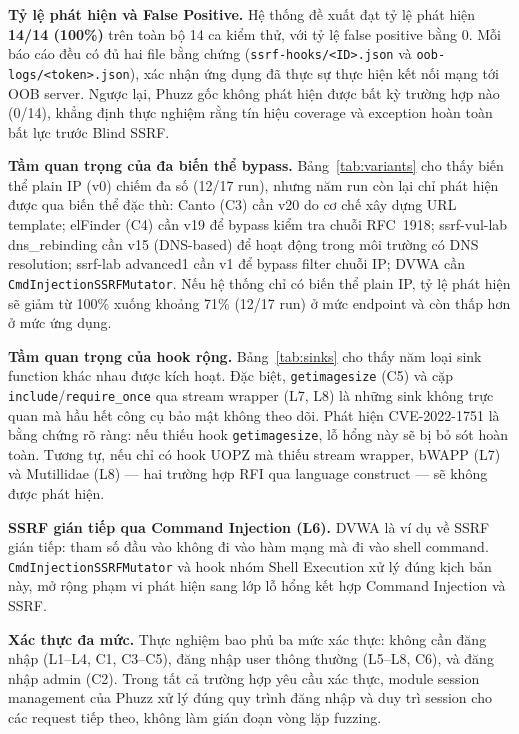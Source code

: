 \textbf{Tỷ lệ phát hiện và False Positive.}
Hệ thống đề xuất đạt tỷ lệ phát hiện \textbf{14/14 (100\%)} trên toàn
bộ 14 ca kiểm thử, với tỷ lệ false positive bằng 0. Mỗi báo cáo đều
có đủ hai file bằng chứng (\texttt{ssrf-hooks/<ID>.json} và
\texttt{oob-logs/<token>.json}), xác nhận ứng dụng đã thực sự thực
hiện kết nối mạng tới OOB server. Ngược lại, Phuzz gốc không phát hiện
được bất kỳ trường hợp nào (0/14), khẳng định thực nghiệm rằng tín
hiệu coverage và exception hoàn toàn bất lực trước Blind SSRF.

\textbf{Tầm quan trọng của đa biến thể bypass.}
Bảng~\ref{tab:variants} cho thấy biến thể plain IP (v0) chiếm đa số
(12/17 run), nhưng năm run còn lại chỉ phát hiện được qua biến thể
đặc thù: Canto (C3) cần v20 do cơ chế xây dựng URL template; elFinder
(C4) cần v19 để bypass kiểm tra chuỗi RFC~1918; ssrf-vul-lab
dns\_rebinding cần v15 (DNS-based) để hoạt động trong môi trường có
DNS resolution; ssrf-lab advanced1 cần v1 để bypass filter chuỗi IP;
DVWA cần \texttt{CmdInjectionSSRFMutator}. Nếu hệ thống chỉ có biến
thể plain IP, tỷ lệ phát hiện sẽ giảm từ 100\% xuống khoảng 71\%
(12/17 run) ở mức endpoint và còn thấp hơn ở mức ứng dụng.

\textbf{Tầm quan trọng của hook rộng.}
Bảng~\ref{tab:sinks} cho thấy năm loại sink function khác nhau được
kích hoạt. Đặc biệt, \texttt{getimagesize} (C5) và cặp
\texttt{include}/\texttt{require\_once} qua stream wrapper (L7, L8) là
những sink không trực quan mà hầu hết công cụ bảo mật không theo dõi.
Phát hiện CVE-2022-1751 là bằng chứng rõ ràng: nếu thiếu hook
\texttt{getimagesize}, lỗ hổng này sẽ bị bỏ sót hoàn toàn. Tương tự,
nếu chỉ có hook UOPZ mà thiếu stream wrapper, bWAPP (L7) và Mutillidae
(L8) --- hai trường hợp RFI qua language construct --- sẽ không được
phát hiện.

\textbf{SSRF gián tiếp qua Command Injection (L6).}
DVWA là ví dụ về SSRF gián tiếp: tham số đầu vào không đi vào hàm
mạng mà đi vào shell command. \texttt{CmdInjectionSSRFMutator} và hook
nhóm Shell Execution xử lý đúng kịch bản này, mở rộng phạm vi phát
hiện sang lớp lỗ hổng kết hợp Command Injection và SSRF.

\textbf{Xác thực đa mức.}
Thực nghiệm bao phủ ba mức xác thực: không cần đăng nhập (L1--L4, C1,
C3--C5), đăng nhập user thông thường (L5--L8, C6), và đăng nhập admin
(C2). Trong tất cả trường hợp yêu cầu xác thực, module session
management của Phuzz xử lý đúng quy trình đăng nhập và duy trì session
cho các request tiếp theo, không làm gián đoạn vòng lặp fuzzing.

